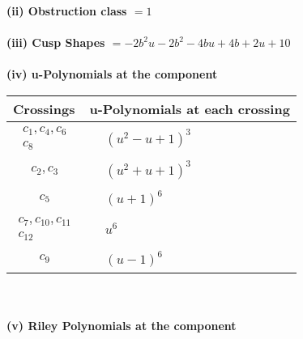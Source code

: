 \documentclass[1p]{elsarticle_modified}
\theoremstyle{definition}
\begin{document}
\flushleft \textbf{(ii) Obstruction class $= 1$}\\~\\
\flushleft \textbf{(iii) Cusp Shapes $= -2 b^2 u-2 b^2-4 b u+4 b+2 u+10$}\\~\\
\newpage\renewcommand{\arraystretch}{1}
\flushleft \textbf{(iv) u-Polynomials at the component}\newline \\
\begin{tabular}{m{50pt}|m{274pt}}
Crossings & \hspace{64pt}u-Polynomials at each crossing \\
\hline $$\begin{aligned}c_{1},c_{4},c_{6}\\c_{8}\end{aligned}$$&$\begin{aligned}
&(u^2- u+1)^3
\end{aligned}$\\
\hline $$\begin{aligned}c_{2},c_{3}\end{aligned}$$&$\begin{aligned}
&(u^2+u+1)^3
\end{aligned}$\\
\hline $$\begin{aligned}c_{5}\end{aligned}$$&$\begin{aligned}
&(u+1)^6
\end{aligned}$\\
\hline $$\begin{aligned}c_{7},c_{10},c_{11}\\c_{12}\end{aligned}$$&$\begin{aligned}
&u^6
\end{aligned}$\\
\hline $$\begin{aligned}c_{9}\end{aligned}$$&$\begin{aligned}
&(u-1)^6
\end{aligned}$\\
\hline
\end{tabular}\\~\\
\newpage\renewcommand{\arraystretch}{1}
\flushleft \textbf{(v) Riley Polynomials at the component}\newline \\
\end{document}
